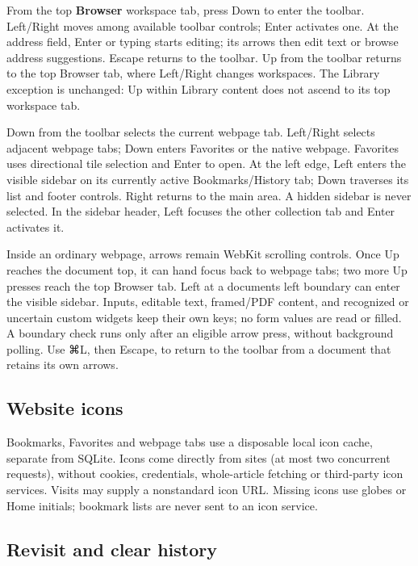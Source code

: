\documentclass[10pt,letterpaper,oneside]{scrreprt}
\begin{document}
From the top \textbf{Browser} workspace tab, press Down to enter the toolbar. Left/Right moves among available toolbar controls; Enter activates one. At the address field, Enter or typing starts editing; its arrows then edit text or browse address suggestions. Escape returns to the toolbar. Up from the toolbar returns to the top Browser tab, where Left/Right changes workspaces. The Library exception is unchanged: Up within Library content does not ascend to its top workspace tab.

Down from the toolbar selects the current webpage tab. Left/Right selects adjacent webpage tabs; Down enters Favorites or the native webpage. Favorites uses directional tile selection and Enter to open. At the left edge, Left enters the visible sidebar on its currently active Bookmarks/History tab; Down traverses its list and footer controls. Right returns to the main area. A hidden sidebar is never selected. In the sidebar header, Left focuses the other collection tab and Enter activates it.

Inside an ordinary webpage, arrows remain WebKit scrolling controls. Once Up reaches the document top, it can hand focus back to webpage tabs; two more Up presses reach the top Browser tab. Left at a document\textquotesingle s left boundary can enter the visible sidebar. Inputs, editable text, framed/PDF content, and recognized or uncertain custom widgets keep their own keys; no form values are read or filled. A boundary check runs only after an eligible arrow press, without background polling. Use {{\symbolfont ⌘}L}, then Escape, to return to the toolbar from a document that retains its own arrows.

\subsection{Website icons}\label{website-icons}

Bookmarks, Favorites and webpage tabs use a disposable local icon cache, separate from SQLite. Icons come directly from sites (at most two concurrent requests), without cookies, credentials, whole-article fetching or third-party icon services. Visits may supply a nonstandard icon URL. Missing icons use globes or Home initials; bookmark lists are never sent to an icon service.

\subsection{Revisit and clear history}\label{revisit-and-clear-history}
\end{document}
